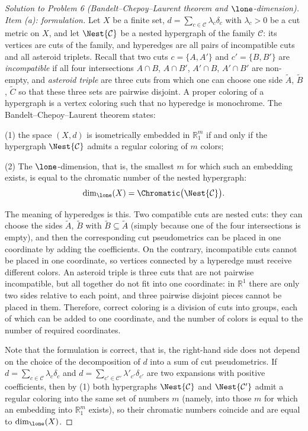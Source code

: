 \documentclass[a4paper,12pt]{report}
\begin{document}
\begin{proof}[Solution to Problem \textup{6} \textup{(}Bandelt--Chepoy--Laurent theorem and $\lone$-dimension\textup{)}]
\textit{Item \textup{(a)}\textup{:} formulation.} Let $X$ be a finite set, $d=\sum_{c\in\mathcal C}\lambda_c\delta_c$ with $\lambda_c>0$ be a cut metric on $X$, and let $\Nest{\mathcal C}$ be a nested hypergraph of the family $\mathcal C$\textup{:} its vertices are cuts of the family, and hyperedges are all pairs of incompatible cuts and all asteroid triplets. Recall that two cuts $c=\{A,A'\}$ and $c'=\{B,B'\}$ are \emph{incompatible} if all four intersections $A\cap B$, $A\cap B'$, $A'\cap B$, $A'\cap B'$ are non-empty, and \emph{asteroid triple} are three cuts from which one can choose one side $\widetilde A$, $\widetilde B$, $\widetilde C$ so that these three sets are pairwise disjoint. A proper coloring of a hypergraph is a vertex coloring such that no hyperedge is monochrome. The Bandelt--Chepoy--Laurent theorem states\textup{:}

\textup{(1)} the space $(X,d)$ is isometrically embedded in $\mathbb R^m_1$ if and only if the hypergraph $\Nest{\mathcal C}$ admits a regular coloring of $m$ colors\textup{;}

\textup{(2)} The $\lone$-dimension, that is, the smallest $m$ for which such an embedding exists, is equal to the chromatic number of the nested hypergraph\textup{:}
\[
\dim_{\lone}(X)=\Chromatic\bigl(\Nest{\mathcal C}\bigr).
\]

The meaning of hyperedges is this. Two compatible cuts are nested cuts\textup{:} they can choose the sides $\widetilde A$, $\widetilde B$ with $\widetilde B\subseteq\widetilde A$ \textup{(}simply because one of the four intersections is empty\textup{)}, and then the corresponding cut pseudometrics can be placed in one coordinate by adding the coefficients. On the contrary, incompatible cuts cannot be placed in one coordinate, so vertices connected by a hyperedge must receive different colors. An asteroid triple is three cuts that are not pairwise incompatible, but all together do not fit into one coordinate\textup{:} in $\mathbb R^1$ there are only two sides relative to each point, and three pairwise disjoint pieces cannot be placed in them. Therefore, correct coloring is a division of cuts into groups, each of which can be added to one coordinate, and the number of colors is equal to the number of required coordinates.

Note that the formulation is correct, that is, the right-hand side does not depend on the choice of the decomposition of $d$ into a sum of cut pseudometrics. If $d=\sum_{c\in\mathcal C}\lambda_c\delta_c$ and $d=\sum_{c'\in\mathcal C'}\lambda'_{c'}\delta_{c'}$ are two expansions with positive coefficients, then by \textup{(1)} both hypergraphs $\Nest{\mathcal C}$ and $\Nest{\mathcal C'}$ admit a regular coloring into the same set of numbers $m$ (namely, into those $m$ for which an embedding into $\mathbb R^m_1$ exists), so their chromatic numbers coincide and are equal to $\dim_{\lone}(X)$.


\end{proof}
\end{document}
